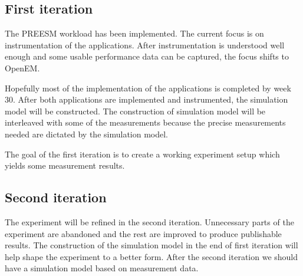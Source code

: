 \subsection{First iteration}
The PREESM workload has been implemented. The current focus is on instrumentation of the applications. After instrumentation is understood well enough and some usable performance data can be captured, the focus shifts to OpenEM.

Hopefully most of the implementation of the applications is completed by week 30. After both applications are implemented and instrumented, the simulation model will be constructed. The construction of simulation model will be interleaved with some of the measurements because the precise measurements needed are dictated by the simulation model.

The goal of the first iteration is to create a working experiment setup which yields some measurement results.
\subsection{Second iteration}
The experiment will be refined in the second iteration. Unnecessary parts of the experiment are abandoned and the rest are improved to produce publishable results. The construction of the simulation model in the end of first iteration will help shape the experiment to a better form. After the second iteration we should have a simulation model based on measurement data.